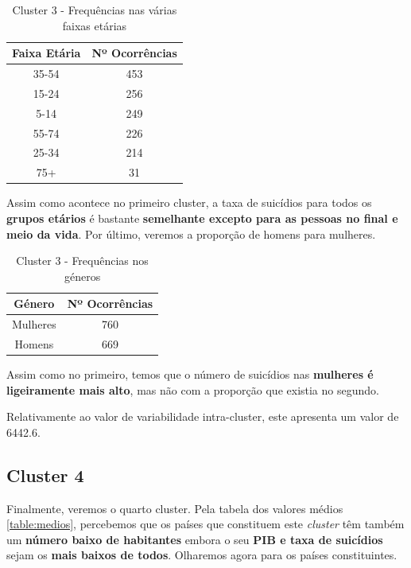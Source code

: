 \documentclass[a4paper,12pt]{article}
\begin{document}
\begin{table}[H]
	\centering
	\caption{Cluster 3 - Frequências nas várias faixas etárias}
	\begin{tabular}{|c|c|} 
		\hline
		\rowcolor[rgb]{0.678,1,0.851} Faixa Etária & Nº Ocorrências  \\ 
		\hline
		35-54                                       & 453            \\ 
		\hline
		15-24                                      & 256            \\ 
		\hline
		5-14                                      & 249            \\ 
		\hline
		55-74                                      & 226            \\ 
		\hline
		25-34                                      & 214            \\ 
		\hline
		75+                                        & 31            \\
		\hline
	\end{tabular}
\end{table}

Assim como acontece no primeiro cluster, a taxa de suicídios para todos os \textbf{grupos etários} é bastante \textbf{semelhante excepto para as pessoas no final e meio da vida}.
Por último, veremos a proporção de homens para mulheres.

\begin{table}[H]
	\centering
	\caption{Cluster 3 - Frequências nos géneros}
	\begin{tabular}{|c|c|} 
		\hline
		\rowcolor[rgb]{0.2,0.7,0.6} Género   & Nº Ocorrências  \\ 
		\hline
		Mulheres & 760            \\ 
		\hline
		  Homens & 669            \\
		\hline
	\end{tabular}
\end{table}

Assim como no primeiro, temos que o número de suicídios nas \textbf{mulheres é ligeiramente mais alto}, mas não com a proporção que existia no segundo.

Relativamente ao valor de variabilidade intra-cluster, este apresenta um valor de 6442.6.

\subsection{Cluster 4}

Finalmente, veremos o quarto cluster. Pela tabela dos valores médios \ref{table:medios}, percebemos que os países que constituem este \textit{cluster} têm também um \textbf{número baixo de habitantes} embora o seu \textbf{PIB e taxa de suicídios} sejam os \textbf{mais baixos de todos}. Olharemos agora para os países constituintes.
\end{document}
